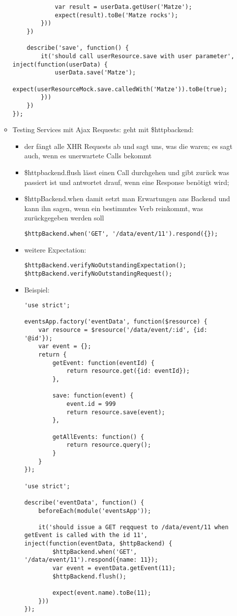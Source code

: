 \begin{itemize}
\begin{itemize}
\begin{verbatim}
            var result = userData.getUser('Matze');
            expect(result).toBe('Matze rocks');
        }))
    })

    describe('save', function() {
        it('should call userResource.save with user parameter', inject(function(userData) {
            userData.save('Matze');
            expect(userResourceMock.save.calledWith('Matze')).toBe(true);
        }))
    })
});
        \end{verbatim}
			\item Testing Services mit Ajax Requests: geht mit \$httpbackend:
        \begin{itemize}
          \item der fängt alle XHR Requests ab und sagt uns, was die waren; es sagt auch, wenn es unerwartete Calls bekommt
          \item  \$httpbackend.flush lässt einen Call durchgehen und gibt zurück was passiert ist und antwortet drauf, wenn eine Response benötigt wird;
          \item \$httpBackend.when damit setzt man Erwartungen ans Backend und kann ihn sagen, wenn ein bestimmtes Verb reinkommt, was zurückgegeben werden soll
            \begin{verbatim}
$httpBackend.when('GET', '/data/event/11').respond({});
            \end{verbatim}
          \item weitere Expectation:
            \begin{verbatim}
$httpBackend.verifyNoOutstandingExpectation();
$httpBackend.verifyNoOutstandingRequest();
            \end{verbatim}
          \item Beispiel:
            \begin{verbatim}
'use strict';

eventsApp.factory('eventData', function($resource) {
    var resource = $resource('/data/event/:id', {id: '@id'});
    var event = {};
    return {
        getEvent: function(eventId) {
            return resource.get({id: eventId});
        },

        save: function(event) {
            event.id = 999
            return resource.save(event);
        },

        getAllEvents: function() {
            return resource.query();
        }
    }
});

'use strict';

describe('eventData', function() {
    beforeEach(module('eventsApp'));

    it('should issue a GET reqquest to /data/event/11 when getEvent is called with the id 11', inject(function(eventData, $httpBackend) {
        $httpBackend.when('GET', '/data/event/11').respond({name: 11});
        var event = eventData.getEvent(11);
        $httpBackend.flush();

        expect(event.name).toBe(11);
    }))
});
            \end{verbatim}

        \end{itemize}
    \end{itemize}
\end{itemize}


